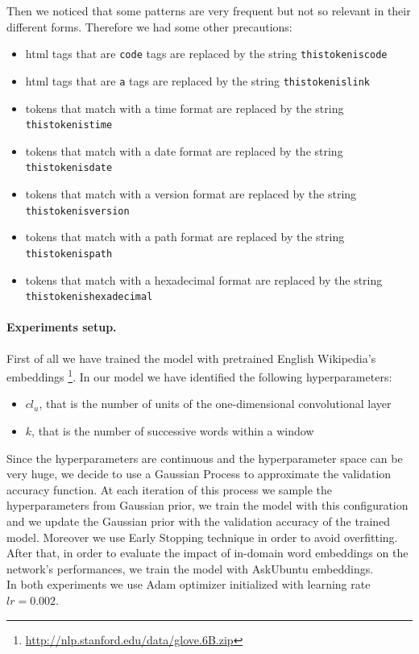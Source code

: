 \documentclass[10pt,twocolumn,letterpaper]{article}
\begin{document}
Then we noticed that some patterns are very frequent but not so relevant in their different forms. Therefore we had some other precautions:
\begin{itemize}
	\item html tags that are \texttt{code} tags are replaced by the string \texttt{thistokeniscode}
	\item html tags that are \texttt{a} tags are replaced by the string \texttt{thistokenislink}
	\item tokens that match with a time format are replaced by the string \texttt{thistokenistime}
	\item tokens that match with a date format are replaced by the string \texttt{thistokenisdate}
	\item tokens that match with a version format are replaced by the string \texttt{thistokenisversion}
	\item tokens that match with a path format are replaced by the string \texttt{thistokenispath}
	\item tokens that match with a hexadecimal format are replaced by the string \texttt{thistokenishexadecimal}
 \end{itemize}
 
\paragraph{Experiments setup.}
First of all we have trained the model with pretrained English Wikipedia's embeddings \footnote{\url{http://nlp.stanford.edu/data/glove.6B.zip}}. In our model we have identified the following hyperparameters: 
\begin{itemize}
	\item $cl_{u}$, that is the number of units of the one-dimensional convolutional layer
	\item $k$, that is the number of successive words within a window
\end{itemize}
Since the hyperparameters are continuous and the hyperparameter space can be very huge, we decide to use a Gaussian Process to approximate the validation accuracy function. At each iteration of this process we sample the hyperparameters from Gaussian prior, we train the model with this configuration and we update the Gaussian prior with the validation accuracy of the trained model. Moreover we use Early Stopping technique in order to avoid overfitting. \\
After that, in order to evaluate the impact of in-domain word embeddings on the network's performances, we train the model with AskUbuntu embeddings. \\
In both experiments we use Adam optimizer initialized with learning rate $ lr=0.002 $. 
\end{document}
